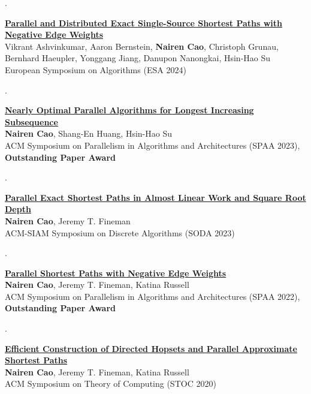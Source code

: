 \documentclass[10pt,a4paper]{article}
\newcounter{paper}
\newcommand{\publication}[3]{\stepcounter{paper}\begin{samepage}\noindent\begin{minipage}[t]{0.04\linewidth}\small\color{ink}\thepaper.\end{minipage}\begin{minipage}[t]{0.955\linewidth}\textbf{#1}\\#2\\{\fontsize{8.7}{10.3}\selectfont\color{ink}#3}\end{minipage}\par\vspace{5pt}\end{samepage}}
\begin{document}
\publication{\href{https://nairenc.github.io/nairenc_files/parallel_negative_SSSP_almost_linear.pdf}{Parallel and Distributed Exact Single-Source Shortest Paths with Negative Edge Weights}}{Vikrant Ashvinkumar, Aaron Bernstein, \textbf{Nairen Cao}, Christoph Grunau, Bernhard Haeupler, Yonggang Jiang, Danupon Nanongkai, Hsin-Hao Su}{European Symposium on Algorithms (ESA 2024)}
\publication{\href{https://dl.acm.org/doi/10.1145/3558481.3591078}{Nearly Optimal Parallel Algorithms for Longest Increasing Subsequence}}{\textbf{Nairen Cao}, Shang-En Huang, Hsin-Hao Su}{ACM Symposium on Parallelism in Algorithms and Architectures (SPAA 2023), \textbf{Outstanding Paper Award}}
\publication{\href{https://epubs.siam.org/doi/10.1137/1.9781611977554.ch166}{Parallel Exact Shortest Paths in Almost Linear Work and Square Root Depth}}{\textbf{Nairen Cao}, Jeremy T. Fineman}{ACM-SIAM Symposium on Discrete Algorithms (SODA 2023)}
\publication{\href{https://dl.acm.org/doi/abs/10.1145/3490148.3538583}{Parallel Shortest Paths with Negative Edge Weights}}{\textbf{Nairen Cao}, Jeremy T. Fineman, Katina Russell}{ACM Symposium on Parallelism in Algorithms and Architectures (SPAA 2022), \textbf{Outstanding Paper Award}}
\publication{\href{https://dl.acm.org/doi/10.1145/3357713.3384270}{Efficient Construction of Directed Hopsets and Parallel Approximate Shortest Paths}}{\textbf{Nairen Cao}, Jeremy T. Fineman, Katina Russell}{ACM Symposium on Theory of Computing (STOC 2020)}
\end{document}
